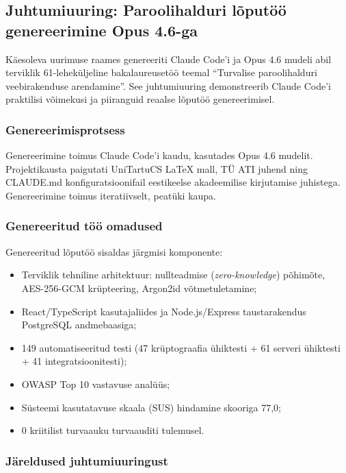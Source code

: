 \subsection{Juhtumiuuring: Paroolihalduri lõputöö genereerimine Opus 4.6-ga} \label{subsec:claudecode-juhtumiuuring}

Käesoleva uurimuse raames genereeriti Claude Code'i ja Opus 4.6 mudeli abil terviklik 61-leheküljeline bakalaureusetöö teemal ``Turvalise paroolihalduri veebirakenduse arendamine''. See juhtumiuuring demonstreerib Claude Code'i praktilisi võimekusi ja piiranguid reaalse lõputöö genereerimisel.

\subsubsection{Genereerimisprotsess}

Genereerimine toimus Claude Code'i kaudu, kasutades Opus 4.6 mudelit. Projektikausta paigutati UniTartuCS \LaTeX{} mall, TÜ ATI juhend ning CLAUDE.md konfiguratsioonifail eestikeelse akadeemilise kirjutamise juhistega. Genereerimine toimus iteratiivselt, peatüki kaupa.

\subsubsection{Genereeritud töö omadused}

Genereeritud lõputöö sisaldas järgmisi komponente:
\begin{itemize}
    \item Terviklik tehniline arhitektuur: nullteadmise (\textit{zero-knowledge}) põhimõte, AES-256-GCM krüpteering, Argon2id võtmetuletamine;
    \item React/TypeScript kasutajaliides ja Node.js/Express taustarakendus PostgreSQL andmebaasiga;
    \item 149 automatiseeritud testi (47 krüptograafia ühiktesti + 61 serveri ühiktesti + 41 integratsioonitesti);
    \item OWASP Top 10 vastavuse analüüs;
    \item Süsteemi kasutatavuse skaala (SUS) hindamine skooriga 77,0;
    \item 0 kriitilist turvaauku turvaauditi tulemusel.
\end{itemize}

\subsubsection{Järeldused juhtumiuuringust}

